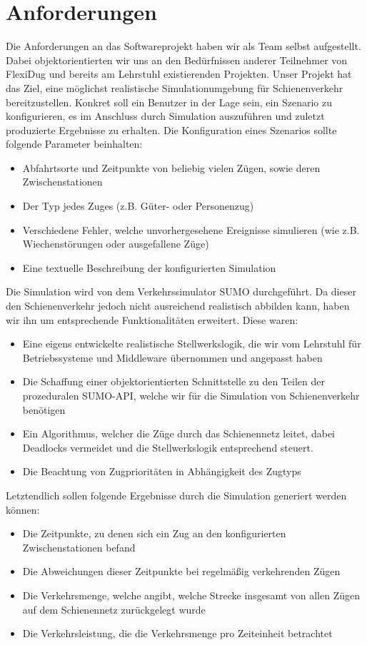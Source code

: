 \section{Anforderungen}
Die Anforderungen an das Softwareprojekt haben wir als Team selbst aufgestellt. Dabei objektorientierten wir uns an den Bedürfnissen anderer Teilnehmer von FlexiDug und bereits am Lehrstuhl existierenden Projekten. Unser Projekt hat das Ziel, eine möglichst realistische Simulationumgebung für Schienenverkehr bereitzustellen. Konkret soll ein Benutzer in der Lage sein, ein Szenario zu konfigurieren, es im Anschluss durch Simulation auszuführen und zuletzt produzierte Ergebnisse zu erhalten. Die Konfiguration eines Szenarios sollte folgende Parameter beinhalten:
\begin{itemize}
    \item Abfahrtsorte und Zeitpunkte von beliebig vielen Zügen, sowie deren Zwischenstationen
    \item Der Typ jedes Zuges (z.B. Güter- oder Personenzug)
    \item Verschiedene Fehler, welche unvorhergesehene Ereignisse simulieren (wie z.B. Wiechenstörungen oder ausgefallene Züge)
    \item Eine textuelle Beschreibung der konfigurierten Simulation
\end{itemize}
Die Simulation wird von dem Verkehrssimulator SUMO \cite{noauthor_eclipse_nodate} durchgeführt. Da dieser den Schienenverkehr jedoch nicht ausreichend realistisch abbilden kann, haben wir ihn um entsprechende Funktionalitäten erweitert. Diese waren:
\begin{itemize}
    \item Eine eigens entwickelte realistische Stellwerkslogik, die wir vom Lehrstuhl für Betriebssysteme und Middleware übernommen und angepasst haben \cite{noauthor_interlocking_2023}
    \item Die Schaffung einer objektorientierten Schnittstelle zu den Teilen der prozeduralen SUMO-API, welche wir für die Simulation von Schienenverkehr benötigen
    \item Ein Algorithmus, welcher die Züge durch das Schienennetz leitet, dabei Deadlocks vermeidet und die Stellwerkslogik entsprechend steuert.
    \item Die Beachtung von Zugprioritäten in Abhängigkeit des Zugtyps
\end{itemize}
Letztendlich sollen folgende Ergebnisse durch die Simulation generiert werden können:
\begin{itemize}
    \item Die Zeitpunkte, zu denen sich ein Zug an den konfigurierten Zwischenstationen befand
    \item Die Abweichungen dieser Zeitpunkte bei regelmäßig verkehrenden Zügen
    \item Die Verkehrsmenge, welche angibt, welche Strecke insgesamt von allen Zügen auf dem Schienennetz zurückgelegt wurde
    \item Die Verkehrsleistung, die die Verkehrsmenge pro Zeiteinheit betrachtet
\end{itemize}

